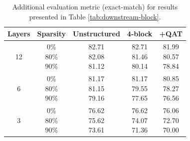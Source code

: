 \documentclass[11pt]{article}
\begin{document}
\begin{table}[htb!]
    \centering
    {\small
    \begin{tabular}{c|c|c|cc}
    \toprule
    Layers & Sparsity & Unstructured & 4-block & +QAT \\
    \midrule
    12 &  \makecell{0\% \\ 80\% \\90\%} & \makecell{82.71 \\ 82.08 \\ 81.12} & \makecell{82.71 \\ 81.46 \\ 80.14} & \makecell{81.99 \\ 80.57 \\ 78.84}\\
    \midrule
    6 & \makecell{0\% \\ 80\% \\90\%} & \makecell{81.17 \\ 81.15 \\ 79.16} & \makecell{81.17 \\ 79.55 \\ 77.65}  & \makecell{80.85 \\ 78.27 \\ 76.56}\\
    \midrule
    3 & \makecell{0\% \\ 80\% \\90\%}  & \makecell{76.62 \\ 75.62 \\ 73.61} & \makecell{76.62 \\ 74.07 \\ 71.36} & \makecell{76.06 \\ 72.70 \\ 70.00} \\
    \bottomrule
    \end{tabular}
    \caption{Additional evaluation metric (exact-match) for results presented in Table \ref{tab:downstream-block}.}
    \label{tab:downstream-block-additional}
    }
\end{table}
\end{document}

